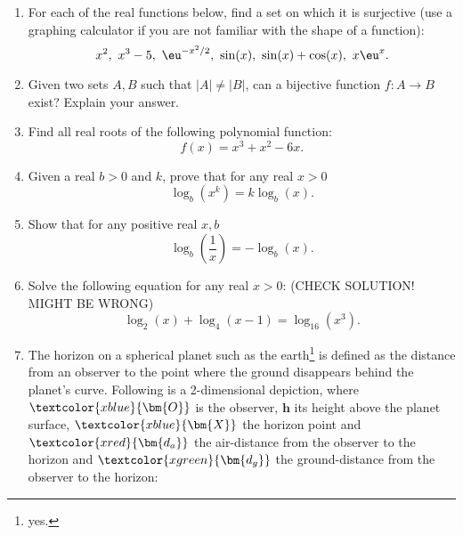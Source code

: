 \begin{enumerate}
	\item For each of the real functions below, find a set on which it is surjective (use a graphing calculator if you are not familiar with the shape of a function):
		\[
			x^{2},\ x^{3}-5,\ \eu^{-x^{2}/2},\ \sin(x),\ \sin(x)+\cos(x),\ x\eu^{x}.
		\]

	\item Given two sets $A,B$ such that $|A|\neq|B|$, can a bijective function $f:A\to B$ exist? Explain your answer.

	\item Find all real roots of the following polynomial function:
		\[
			f(x) = x^{3} + x^{2} - 6x.
		\]

	\item Given a real $b>0$ and $k$, prove that for any real $x>0$
		\[
			\log_{b} \left( x^{k} \right) = k\log_{b} \left( x \right).
		\]

	\item Show that for any positive real $x,b$
		\[
			\log_{b} \left( \frac{1}{x} \right) = -\log_{b}(x).
		\]

	\item Solve the following equation for any real $x>0$: (CHECK SOLUTION! MIGHT BE WRONG)
		\[
			\log_{2}(x) + \log_{4}(x-1) = \log_{16}\left(x^{3}\right).
		\]

	\item The horizon on a spherical planet such as the earth\footnote{yes.} is defined as the distance from an observer to the point where the ground disappears behind the planet's curve. Following is a 2-dimensional depiction, where $\textcolor{xblue}{\bm{O}}$ is the observer, $\bm{h}$ its height above the planet surface, $\textcolor{xblue}{\bm{X}}$ the horizon point and $\textcolor{xred}{\bm{d_{a}}}$ the air-distance from the observer to the horizon and $\textcolor{xgreen}{\bm{d_{g}}}$ the ground-distance from the observer to the horizon:

		\begin{center}
		\end{center}


\end{enumerate}
